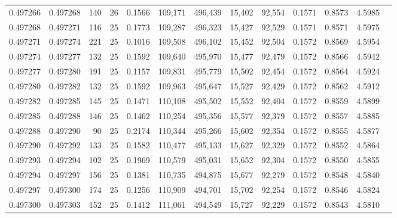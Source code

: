 \begin{tabular}{rrrrrrrrrrrrr}
0.497266 & 0.497268 & 140 &  26 &                                     0.1566 & 109,171 & 496,439 &  15,402 &  92,554 & 0.1571 & 0.8573 & 4.5985 \\
0.497268 & 0.497271 & 116 &  25 &                                     0.1773 & 109,287 & 496,323 &  15,427 &  92,529 & 0.1571 & 0.8571 & 4.5975 \\
0.497271 & 0.497274 & 221 &  25 &                                     0.1016 & 109,508 & 496,102 &  15,452 &  92,504 & 0.1572 & 0.8569 & 4.5954 \\
0.497274 & 0.497277 & 132 &  25 &                                     0.1592 & 109,640 & 495,970 &  15,477 &  92,479 & 0.1572 & 0.8566 & 4.5942 \\
0.497277 & 0.497280 & 191 &  25 &                                     0.1157 & 109,831 & 495,779 &  15,502 &  92,454 & 0.1572 & 0.8564 & 4.5924 \\
0.497280 & 0.497282 & 132 &  25 &                                     0.1592 & 109,963 & 495,647 &  15,527 &  92,429 & 0.1572 & 0.8562 & 4.5912 \\
0.497282 & 0.497285 & 145 &  25 &                                     0.1471 & 110,108 & 495,502 &  15,552 &  92,404 & 0.1572 & 0.8559 & 4.5899 \\
0.497285 & 0.497288 & 146 &  25 &                                     0.1462 & 110,254 & 495,356 &  15,577 &  92,379 & 0.1572 & 0.8557 & 4.5885 \\
0.497288 & 0.497290 &  90 &  25 &                                     0.2174 & 110,344 & 495,266 &  15,602 &  92,354 & 0.1572 & 0.8555 & 4.5877 \\
0.497290 & 0.497292 & 133 &  25 &                                     0.1582 & 110,477 & 495,133 &  15,627 &  92,329 & 0.1572 & 0.8552 & 4.5864 \\
0.497293 & 0.497294 & 102 &  25 &                                     0.1969 & 110,579 & 495,031 &  15,652 &  92,304 & 0.1572 & 0.8550 & 4.5855 \\
0.497294 & 0.497297 & 156 &  25 &                                     0.1381 & 110,735 & 494,875 &  15,677 &  92,279 & 0.1572 & 0.8548 & 4.5840 \\
0.497297 & 0.497300 & 174 &  25 &                                     0.1256 & 110,909 & 494,701 &  15,702 &  92,254 & 0.1572 & 0.8546 & 4.5824 \\
0.497300 & 0.497303 & 152 &  25 &                                     0.1412 & 111,061 & 494,549 &  15,727 &  92,229 & 0.1572 & 0.8543 & 4.5810 \\

\end{tabular}
